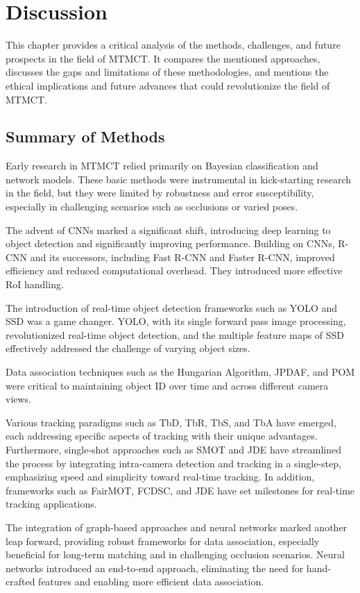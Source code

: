 \chapter{Discussion}\label{chap:discussion}
This chapter provides a critical analysis of the methods, challenges, and future prospects in the field of MTMCT. It compares the mentioned approaches, discusses the gaps and limitations of these methodologies, and mentions the ethical implications and future advances that could revolutionize the field of MTMCT.

\section{Summary of Methods}\label{sec:summary_of_methods}
Early research in MTMCT relied primarily on Bayesian classification and network models. These basic methods were instrumental in kick-starting research in the field, but they were limited by robustness and error susceptibility, especially in challenging scenarios such as occlusions or varied poses.

The advent of CNNs marked a significant shift, introducing deep learning to object detection and significantly improving performance. Building on CNNs, R-CNN and its successors, including Fast R-CNN and Faster R-CNN, improved efficiency and reduced computational overhead. They introduced more effective RoI handling.

The introduction of real-time object detection frameworks such as YOLO and SSD was a game changer. YOLO, with its single forward pass image processing, revolutionized real-time object detection, and the multiple feature maps of SSD effectively addressed the challenge of varying object sizes.

Data association techniques such as the Hungarian Algorithm, JPDAF, and POM were critical to maintaining object ID over time and across different camera views.

Various tracking paradigms such as TbD, TbR, TbS, and TbA have emerged, each addressing specific aspects of tracking with their unique advantages. Furthermore, single-shot approaches such as SMOT and JDE have streamlined the process by integrating intra-camera detection and tracking in a single-step, emphasizing speed and simplicity toward real-time tracking. In addition, frameworks such as FairMOT, FCDSC, and JDE have set milestones for real-time tracking applications.

The integration of graph-based approaches and neural networks marked another leap forward, providing robust frameworks for data association, especially beneficial for long-term matching and in challenging occlusion scenarios. Neural networks introduced an end-to-end approach, eliminating the need for hand-crafted features and enabling more efficient data association.

